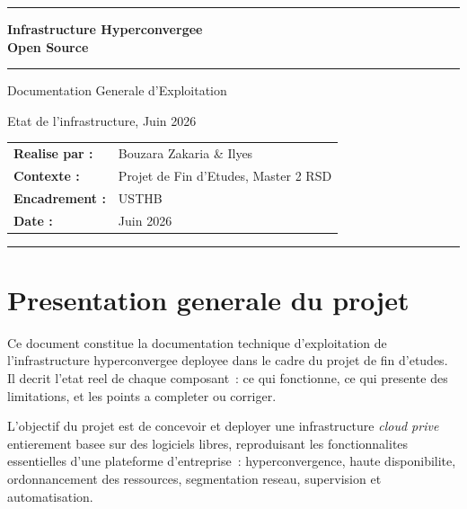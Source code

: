 \documentclass[a4paper,11pt]{article}
\begin{document}
\begin{titlepage}
  \centering
  \vspace*{2cm}
  {\color{bleu}\rule{\linewidth}{1.5pt}}\vspace{0.4cm}

  {\Huge\bfseries\color{bleu} Infrastructure Hyperconvergee\\[0.3em]
  Open Source}\par\vspace{0.5cm}
  {\color{bleu}\rule{\linewidth}{0.6pt}}\par\vspace{0.8cm}

  {\LARGE Documentation Generale d'Exploitation}\par\vspace{0.4cm}
  {\large\color{gray} Etat de l'infrastructure, Juin 2026}\par\vspace{2cm}

  \begin{tabular}{ll}
    \textbf{Realise par :} & Bouzara Zakaria \& Ilyes \\[0.4em]
    \textbf{Contexte :}    & Projet de Fin d'Etudes, Master 2 RSD \\[0.4em]
    \textbf{Encadrement :} & USTHB \\[0.4em]
    \textbf{Date :}        & Juin 2026 \\
  \end{tabular}

  \vfill
  {\color{bleu}\rule{\linewidth}{1.5pt}}
\end{titlepage}

\tableofcontents
\newpage

\section{Presentation generale du projet}

Ce document constitue la documentation technique d'exploitation de l'infrastructure
hyperconvergee deployee dans le cadre du projet de fin d'etudes. Il decrit l'etat
reel de chaque composant~: ce qui fonctionne, ce qui presente des limitations,
et les points a completer ou corriger.

L'objectif du projet est de concevoir et deployer une infrastructure \textit{cloud prive}
entierement basee sur des logiciels libres, reproduisant les fonctionnalites essentielles
d'une plateforme d'entreprise~: hyperconvergence, haute disponibilite, ordonnancement
des ressources, segmentation reseau, supervision et automatisation.
\end{document}
